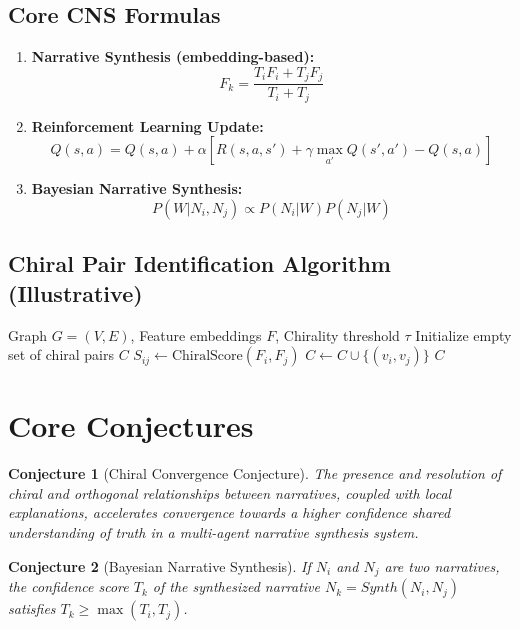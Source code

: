 \documentclass[12pt, a4paper]{article}
\newtheorem{conjecture}{Conjecture}
\begin{document}
\subsection{Core CNS Formulas}

\begin{enumerate}
    \item \textbf{Narrative Synthesis (embedding-based): }
    \[ F_k = \frac{T_i F_i + T_j F_j}{T_i + T_j} \]
    \item \textbf{Reinforcement Learning Update:}
    \[ Q(s, a) = Q(s, a) + \alpha [R(s, a, s') + \gamma \max_{a'} Q(s', a') - Q(s, a)] \]
    \item \textbf{Bayesian Narrative Synthesis:}
    \[ P(W|N_i, N_j) \propto P(N_i|W)P(N_j|W) \]
\end{enumerate}

\subsection{Chiral Pair Identification Algorithm (Illustrative)}

\begin{algorithm}[H]
\caption{Chiral Pair Identification}
\begin{algorithmic}[1]
\Require Graph $G=(V,E)$, Feature embeddings $F$, Chirality threshold $\tau$
\State Initialize empty set of chiral pairs $C$
    \State $S_{ij} \gets \text{ChiralScore}(F_i, F_j)$ 
        \State $C \gets C \cup \{(v_i, v_j)\}$
    \EndIf
\EndFor
\Return $C$
\end{algorithmic}
\end{algorithm}


\section{Core Conjectures}

\begin{conjecture}[Chiral Convergence Conjecture]
The presence and resolution of chiral and orthogonal relationships between narratives, coupled with local explanations, accelerates convergence towards a higher confidence shared understanding of truth in a multi-agent narrative synthesis system.
\end{conjecture}

\begin{conjecture}[Bayesian Narrative Synthesis]
If $N_i$ and $N_j$ are two narratives, the confidence score $T_k$ of the synthesized narrative $N_k = Synth(N_i, N_j)$ satisfies $T_k \ge \max(T_i, T_j)$.
\end{conjecture}
\end{document}
